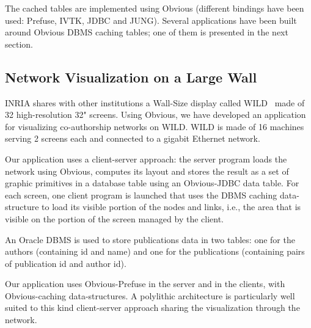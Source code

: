 The cached tables are implemented using Obvious (different bindings
have been used: Prefuse, IVTK, JDBC and JUNG). Several applications have
been built around Obvious DBMS caching tables; one of them is
presented in the next section.

\subsection{Network Visualization on a Large Wall}

INRIA shares with other institutions a Wall-Size display called
WILD~\cite{Wild} made of 32 high-resolution 32" screens.  Using
Obvious, we have developed an application for visualizing
co-authorship networks on WILD.  WILD is made of 16 machines serving 2
screens each and connected to a gigabit Ethernet network.

Our application uses a client-server approach: the server program
loads the network using Obvious, computes its layout and stores the
result as a set of graphic primitives in a database table using an
Obvious-JDBC data table.  For each screen, one client program is
launched that uses the DBMS caching data-structure to load its visible
portion of the nodes and links, i.e., the area that is visible on the
portion of the screen managed by the client.

An Oracle DBMS is used to store publications data in two tables: one
for the authors (containing id and name) and one for the publications
(containing pairs of publication id and author id).

Our application uses Obvious-Prefuse in the server and in the clients,
with Obvious-caching data-structures.  A polylithic architecture is
particularly well suited to this kind client-server approach sharing
the visualization through the network.

